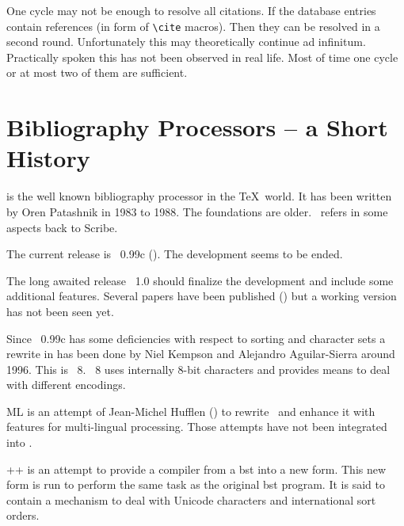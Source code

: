 One cycle may not be enough to resolve all citations. If the database
entries contain references (in form of \verb|\cite|
macros). Then they can be resolved in a
second round. Unfortunately this may theoretically continue ad
infinitum. Practically spoken this has not been observed in real life.
Most of time one cycle or at most two of them are sufficient.


\section{Bibliography Processors -- a Short History}

\BibTeX{} is the well known bibliography processor
in the \TeX\ world. It has been written by Oren
Patashnik in 1983 to 1988. The foundations are
older. \BibTeX\ refers in some aspects back to Scribe.

The current release is \BibTeX~0.99c
(\cite{btxdoc,btxhak}). The development seems to be ended.

The long awaited release \BibTeX~1.0
should finalize the development and include some additional features.
Several papers have been published
(\cite{patashnik:bibtex1.0,patashnik:bibtex}) but a working version
has not been seen yet.

Since \BibTeX~0.99c has some
deficiencies with respect to sorting and character sets a rewrite in
has been done by Niel Kempson and Alejandro
Aguilar-Sierra around 1996. This is
\BibTeX~8. \BibTeX~8 uses internally 8-bit characters and provides
means to deal with different encodings.

ML\BibTeX{} is an attempt of Jean-Michel
Hufflen (\cite{hufflenO1b:oip}) to rewrite
\BibTeX\ and enhance it with features for multi-lingual processing.
Those attempts have not been integrated into \ExBib.

\BibTeX++ \cite{sastre.ea:bibtex++} is an
attempt to provide a compiler from a bst into a new form. This new
form is run to perform the same task as the original bst program. It
is said to contain a mechanism to deal with Unicode characters and
international sort orders.


\INCOMPLETE

\cite{widmann:bibulus}


